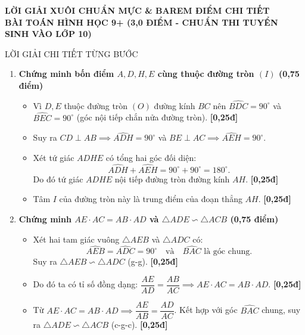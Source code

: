 \documentclass[11pt,a4paper]{article}
\begin{document}
\newpage

\begin{center}
    {\Large\bfseries\color{blue!80!black} LỜI GIẢI XUÔI CHUẨN MỰC \& BAREM ĐIỂM CHI TIẾT}\\[1.5mm]
    {\large\bfseries BÀI TOÁN HÌNH HỌC 9+ (3,0 ĐIỂM - CHUẨN THI TUYỂN SINH VÀO LỚP 10)}
\end{center}

\vspace{1mm}

\begin{solutionbox}{LỜI GIẢI CHI TIẾT TỪNG BƯỚC}
\begin{enumerate}[label=\textbf{\arabic*.}, leftmargin=*]
    \item \textbf{Chứng minh bốn điểm $A, D, H, E$ cùng thuộc đường tròn $(I)$ (0,75 điểm)}
    \begin{itemize}[leftmargin=*, nosep]
        \item Vì $D, E$ thuộc đường tròn $(O)$ đường kính $BC$ nên $\widehat{BDC} = 90^\circ$ và $\widehat{BEC} = 90^\circ$ (góc nội tiếp chắn nửa đường tròn). \hfill \textbf{[0,25đ]}
        \item Suy ra $CD \perp AB \implies \widehat{ADH} = 90^\circ$ và $BE \perp AC \implies \widehat{AEH} = 90^\circ$.
        \item Xét tứ giác $ADHE$ có tổng hai góc đối diện:
        \[
        \widehat{ADH} + \widehat{AEH} = 90^\circ + 90^\circ = 180^\circ.
        \]
        Do đó tứ giác $ADHE$ nội tiếp đường tròn đường kính $AH$. \hfill \textbf{[0,25đ]}
        \item Tâm $I$ của đường tròn này là trung điểm của đoạn thẳng $AH$. \hfill \textbf{[0,25đ]}
    \end{itemize}

    \vspace{1mm}
    \item \textbf{Chứng minh $AE \cdot AC = AB \cdot AD$ và $\triangle ADE \backsim \triangle ACB$ (0,75 điểm)}
    \begin{itemize}[leftmargin=*, nosep]
        \item Xét hai tam giác vuông $\triangle AEB$ và $\triangle ADC$ có:
        \[
        \widehat{AEB} = \widehat{ADC} = 90^\circ \quad \text{và} \quad \widehat{BAC} \text{ là góc chung.}
        \]
        Suy ra $\triangle AEB \backsim \triangle ADC$ (g-g). \hfill \textbf{[0,25đ]}
        \item Do đó ta có tỉ số đồng dạng: $\dfrac{AE}{AD} = \dfrac{AB}{AC} \implies AE \cdot AC = AB \cdot AD$. \hfill \textbf{[0,25đ]}
        \item Từ $AE \cdot AC = AB \cdot AD \implies \dfrac{AE}{AB} = \dfrac{AD}{AC}$. Kết hợp với góc $\widehat{BAC}$ chung, suy ra $\triangle ADE \backsim \triangle ACB$ (c-g-c). \hfill \textbf{[0,25đ]}
    \end{itemize}


\end{enumerate}
\end{solutionbox}
\end{document}
